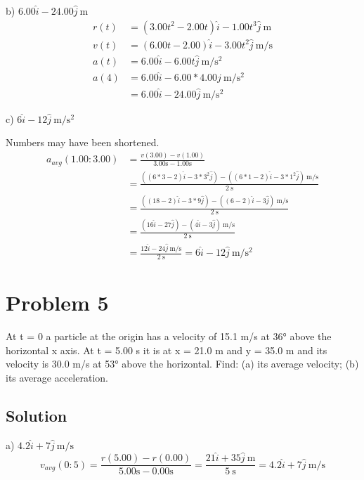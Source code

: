 \documentclass[12pt]{article}
\begin{document}
b) $6.00 \hat{i} - 24.00 \hat{j}\ \unit{\m}$
\begin{align*}
    r(t) &= (3.00 t^2 - 2.00 t) \hat{i} - 1.00 t^3 \hat{j}\ \unit{\m}\\
    v(t) &= (6.00 t - 2.00) \hat{i} - 3.00 t^2 \hat{j}\ \unit{\m/\s}\\
    a(t) &= 6.00 \hat{i} - 6.00 t \hat{j}\ \unit{\m/\s^2}\\
    a(4) &= 6.00 \hat{i} - 6.00 * 4.00 \hat{j}\ \unit{\m/\s^2}\\
        &= \boxed{6.00 \hat{i} - 24.00 \hat{j}\ \unit{\m/\s^2}}
\end{align*}

\pagebreak
c) $6 \hat{i} - 12 \hat{j}\ \unit{\m/\s^2}$

Numbers may have been shortened.
\begin{align*}
    a_{avg}(1.00:3.00) &= \frac{v(3.00) - v(1.00)}{3.00\unit{\s} - 1.00\unit{\s}}\\
        &= \frac{((6 * 3 - 2) \hat{i} - 3 * 3^2 \hat{j}) - ((6 * 1 - 2) \hat{i} - 3 * 1^2 \hat{j})\ \unit{\m/\s}}{2\ \unit{\s}}\\
        &= \frac{((18 - 2) \hat{i} - 3 * 9 \hat{j}) - ((6 - 2) \hat{i} - 3 \hat{j})\ \unit{\m/\s}}{2\ \unit{\s}}\\
        &= \frac{(16 \hat{i} - 27 \hat{j}) - (4 \hat{i} - 3 \hat{j})\ \unit{\m/\s}}{2\ \unit{\s}}\\
        &= \frac{12 \hat{i} - 24 \hat{j}\ \unit{\m/\s}}{2\ \unit{\s}}
        = \boxed{6 \hat{i} - 12 \hat{j}\ \unit{\m/\s^2}}
\end{align*}

\pagebreak
\section*{Problem 5}
At t = 0 a particle at the origin has a velocity of 15.1 m/s at 36° above the horizontal x axis. At t = 5.00 s it is at x = 21.0 m and y = 35.0 m and its velocity is 30.0 m/s at 53° above the horizontal. Find: (a) its average velocity; (b) its average acceleration.

\subsection*{Solution}
a) $4.2\hat{i} + 7\hat{j}\ \unit{\meter/\second}$
\begin{equation*}
    v_{avg}(0:5) = \frac{r(5.00) - r(0.00)}{5.00\unit{\s} - 0.00\unit{\s}} 
                = \frac{21\hat{i} + 35\hat{j}\ \unit{\meter}}{5\ \unit{\second}} 
                = \boxed{4.2\hat{i} + 7\hat{j}\ \unit{\meter/\second}}
\end{equation*}
\end{document}
